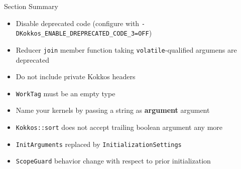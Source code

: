 
\begin{frame}{Section Summary}

  \begin{itemize}
    \item Disable deprecated code (configure with \texttt{-DKokkos\_ENABLE\_DREPRECATED\_CODE\_3=OFF})
    \item Reducer \texttt{join} member function taking \texttt{volatile}-qualified argumens are deprecated
    \item Do not include private Kokkos headers
    \item \texttt{WorkTag} must be an empty type
    \item Name your kernels by passing a string as \textbf{argument} argument
    \item \texttt{Kokkos::sort} does not accept trailing boolean argument any more
    \item \texttt{InitArguments} replaced by \texttt{InitializationSettings}
    \item \texttt{ScopeGuard} behavior change with respect to prior initialization
  \end{itemize}

\end{frame}
